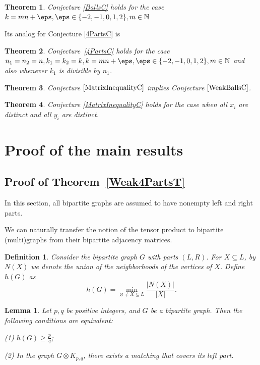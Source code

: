 \documentclass[12pt]{article}
\newtheorem{theorem}{Theorem}
\newtheorem{lemma}{Lemma}[section]
\theoremstyle{definition}
\theoremstyle{plain}
\newtheorem{definition}{Definition}[section]
\renewcommand{\geq}{\geqslant}
\begin{document}
\begin{theorem}\label{BallsT}
Conjecture \ref{BallsC} holds for the case $k=mn+\eps, \eps \in \{ -2, -1, 0, 1, 2\}, m \in \mathbb{N}$%
\end{theorem}

Its analog for Conjecture \ref{4PartsC} is

\begin{theorem}\label{4PartsT}
Conjecture~\ref{4PartsC} holds for the case $n_1=n_2=n, k_1=k_2=k, k=mn+\eps, \eps \in \{ -2, -1, 0, 1, 2\}, m \in \mathbb{N}$ and also whenever $k_1$ is divisible by $n_1$.
\end{theorem}

\begin {theorem}\label{InequalityImpliesTutte}
Conjecture $\ref{MatrixInequalityC}$ implies Conjecture $\ref{WeakBallsC}$.
\end {theorem}

\begin{theorem}\label{SquareMatrixT}
Conjecture \ref{MatrixInequalityC} holds for the case when all $x_i$ are distinct and all $y_i$ are distinct.
\end{theorem}

\section{Proof of the main results}

\subsection{Proof of Theorem~\ref{Weak4PartsT}}

In this section, all bipartite graphs are assumed to have nonempty left and right parts.

We can naturally transfer the notion of the tensor product to bipartite (multi)graphs from their bipartite adjacency matrices.

\begin{definition}
\label{h(G)}
Consider the bipartite graph $G$ with parts $(L,R)$. For $X \subseteq L$, by $N(X)$ we denote the union of the neighborhoods of the vertices of $X$. Define $h(G)$ as
$$
  h(G)=\min_{\varnothing \neq X \subseteq L} \frac{|N(X)|}{|X|}.
$$
\end {definition}

\begin {lemma} \label {TensorWithKL}
Let $p,q$ be positive integers, and $G$ be a bipartite graph. Then the following conditions are equivalent:

(1) $h(G) \geq \frac{p}{q}$;

(2) In the graph $G \otimes K_{p,q}$, there exists a matching that covers its left part.
\end {lemma}
\end{document}
